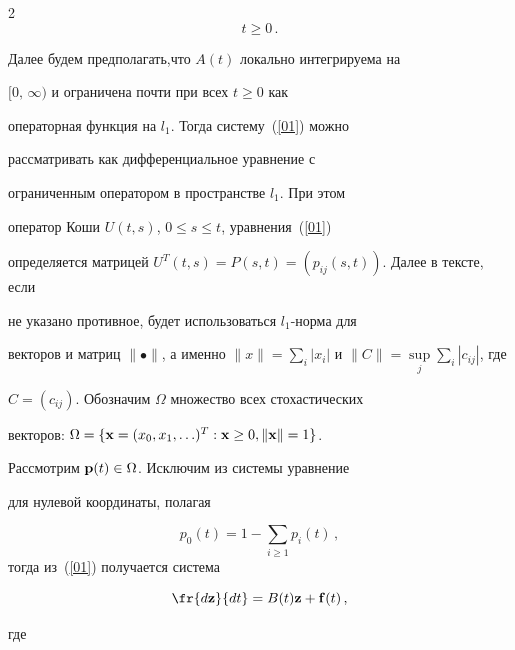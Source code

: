 \begin{multicols}{2}
\begin{equation}
t\geq 0\,. \label{01}


\end{equation}





Далее будем предполагать,что $A(t)$ локально интегрируема на


$[0,\,\infty)$ и ограничена почти при всех $t \ge 0 $ как


операторная функция  на $l_{1}$. Тогда систему~(\ref{01}) можно


рассматривать как дифференциальное уравнение с


ог\-ра\-ни\-чен\-ным оператором в пространстве $l_{1}$. При этом


оператор Коши $ U(t,s)$, $0{\leq s\leq t}$, уравнения~(\ref{01})


определяется матрицей $


U^{T}(t,s)=P(s,t)=\left(p_{ij}(s,t)\right)$. Далее в тексте, если


не указано противное,  будет использоваться  $l_{1}$-норма для


векторов и матриц $\| \bullet \|$, а именно $ \| x


\|=\sum\limits_{i}|x_{i}|$  и $ \| C \|=\sup\limits_j \sum_{i}|c_{ij}|$, где


$C=(c_{ij})$. Обозначим $\Omega$ множество всех стохастических


векторов: $\Omega= \{ {\bf x}=(x_{0},x_{1},\ldots )^{T} : {\bf x}\geq


0, \|{\bf x}\|=1 \}$.





Рассмотрим ${\bf p}(t)\in \Omega$. Исключим из системы уравнение


для нулевой координаты, полагая





$$


p_{0}(t)=1-\sum_{i\geq 1}


p_{i}(t)\,,


$$ тогда из~(\ref{01}) получается система


\begin{equation}


 \fr{d{\bf z}}{dt}=B(t){\bf z} + {\bf f} (t)\,, \label{02}


\end{equation}


где


\begin{align*}



\end{align*}
\end{multicols}
